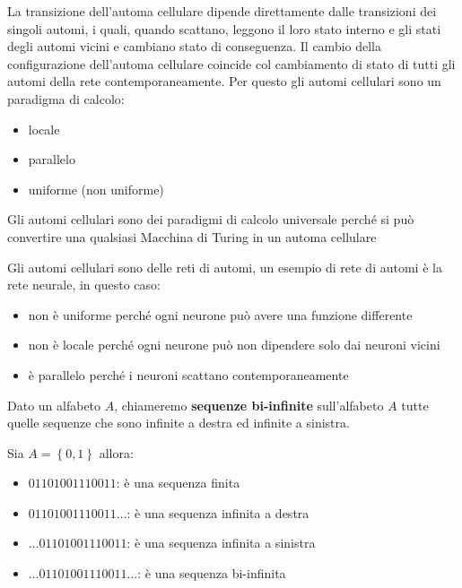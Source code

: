 La transizione dell'automa cellulare dipende direttamente dalle transizioni dei singoli automi,
i quali, quando scattano, leggono il loro stato interno e gli stati degli automi
vicini e cambiano stato di conseguenza. Il cambio della configurazione dell'automa
cellulare coincide col cambiamento di stato di tutti gli automi della rete contemporaneamente.
Per questo gli automi cellulari sono un paradigma di calcolo:
\begin{itemize}
    \item locale
    \item parallelo
    \item uniforme (non uniforme)
\end{itemize}

\begin{nota}
    Gli automi cellulari sono dei paradigmi di calcolo universale perché si
    può convertire una qualsiasi Macchina di Turing in un automa cellulare
\end{nota}

\begin{nota}
    Gli automi cellulari sono delle reti di automi, un esempio di rete di automi
    è la rete neurale, in questo caso:
    \begin{itemize}
        \item non è uniforme perché ogni neurone può avere una funzione differente
        \item non è locale perché ogni neurone può non dipendere solo dai neuroni
              vicini
        \item è parallelo perché i neuroni scattano contemporaneamente
    \end{itemize}
\end{nota}

\begin{definizione} 
    Dato un alfabeto $A$, chiameremo \textbf{sequenze bi-infinite} sull'alfabeto
    $A$ tutte quelle sequenze che sono infinite a destra ed infinite a sinistra.
\end{definizione}

\begin{esempio}
    Sia $A = \left\{0,1\right\}$ allora:
    \begin{itemize}
        \item $01101001110011$: è una sequenza finita
        \item $01101001110011\dots$: è una sequenza infinita a destra
        \item $\dots01101001110011$: è una sequenza infinita a sinistra
        \item $\dots01101001110011\dots$: è una sequenza bi-infinita
    \end{itemize}
\end{esempio}

